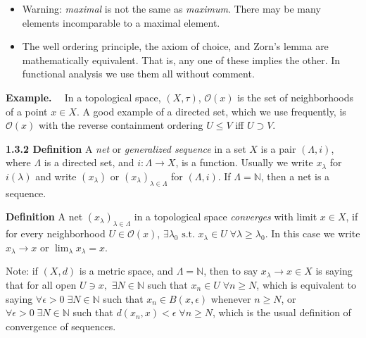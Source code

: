 \documentclass[12pt]{article}
\newcommand{\st}[0]{ \textrm{ s.t. } }
\newcommand{\rarw}[0] { \rightarrow }
\newcommand{\nats}[0] { \mathbb{N}}
\newcommand{\eps}[0] {  \epsilon }
\newcommand{\curlyO}[0] { \mathcal{O} }
\begin{document}
\begin{itemize}
\item Warning: {\em maximal} is not the same as  {\em maximum}.  There may be many
elements incomparable to  a maximal element.


\item The well ordering principle, the axiom of choice, and Zorn's lemma
are mathematically equivalent.  That is, any one of these implies
the other. In functional analysis we use them all without comment.
 \end{itemize}


\begin{flushleft} {\bf Example. \ }
In a topological space, $(X, \tau)$, $\curlyO(x)$ is the set of
neighborhoods of  a point $x \in X$.  A good example of a directed
set, which we use frequently, is $\curlyO(x)$ with  the reverse
containment ordering $U \le V$ iff $U \supset V$.
\end{flushleft}

\begin{flushleft} {\bf 1.3.2 Definition} A \emph{net} or \emph{generalized sequence} in a set $X$ is a pair $(\Lambda, i)$, where $\Lambda$ is a directed set, and $i: \Lambda \rarw X$, is a function. Usually we write $x_\lambda$ for $i(\lambda)$ and write $(x_\lambda)$ or $(x_\lambda)_{\lambda \in \Lambda}$ for $(\Lambda, i)$. If $\Lambda = \nats$, then a net is a sequence.
\end{flushleft}

\begin{flushleft} {\bf Definition} A net $(x_\lambda)_{\lambda \in \Lambda}$ in a topological space \emph{converges} with limit $x \in X$, if for every neighborhood $U \in \curlyO(x)$, $\exists \lambda_0 \st x_\lambda \in U \; \forall \lambda \ge \lambda_0$. In this case we write $x_\lambda \rarw x$ or $\lim_\lambda x_\lambda = x$.
\end{flushleft}

\begin{flushleft} Note: if $(X, d)$ is a metric space, and $\Lambda = \nats$,
then to say $x_\lambda \rarw x \in X$ is saying that for all open $U
\ni x,$ $\exists N \in \nats$ such that  $x_n \in U \; \forall n \ge
N$, which is equivalent to saying $\forall \eps > 0 \; \exists N \in
\nats$ such that  $x_n \in B(x,\eps)$ whenever $n \ge N$, or
$\forall \eps
> 0 \; \exists N \in \nats$ such that  $d(x_n, x) < \eps \; \forall n \ge N$,
which is the usual definition of convergence of sequences.
\end{flushleft}
\end{document}
